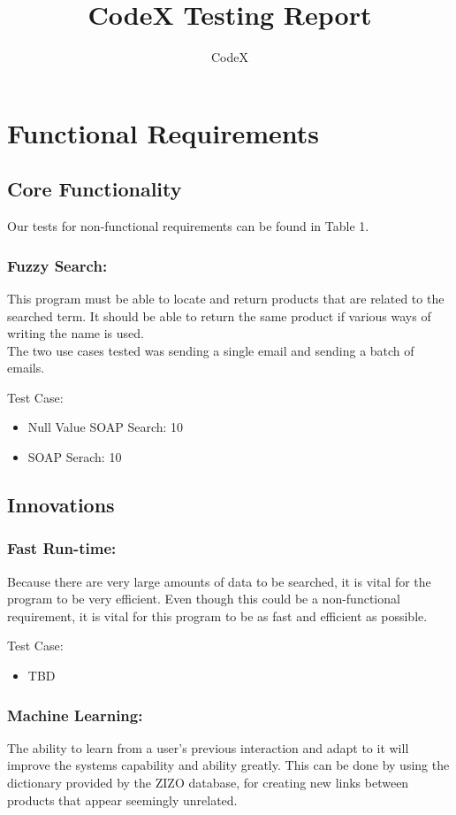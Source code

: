 \documentclass[11pt]{article}
\author{CodeX}
\title{CodeX Testing Report}
\begin{document}
	\setlength{\parskip}{6pt}
	
	
	
	\tableofcontents
	
	\newpage
	
	\section{Functional Requirements}
	\subsection{Core Functionality}
		Our tests for non-functional requirements can be found in Table 1. 
	\subsubsection{Fuzzy Search:}

	This program must be able to locate and return products that are related to the searched term. It should be able to return the same product if various ways of writing the name is used.\\
	The two use cases tested was sending a single email and sending a batch of emails.
	
	Test Case:
	\begin{itemize}
      \item Null Value SOAP Search: 10
      \item SOAP Serach: 10
    \end{itemize}
	\subsection{Innovations}
	\subsubsection{Fast Run-time:}
Because there are very large amounts of data to be searched, it is vital for the program to be very
efficient. Even though this could be a non-functional requirement, it is vital for this program to be as fast
and efficient as possible.	

	Test Case:
	\begin{itemize}	
      \item TBD 
    \end{itemize}
	\subsubsection{Machine Learning:}
	The ability to learn from a user's previous interaction and adapt to it will improve the systems capability and ability greatly. This can be done by 
	using the dictionary provided by the ZIZO database, for creating new links between products that appear seemingly unrelated.
	
\end{document}
